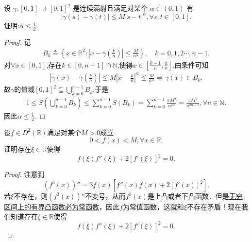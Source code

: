 \documentclass[../../main.tex]{subfiles}
\begin{document}
\begin{example}
设 $\gamma:[0,1]\to[0,1]^2$ 是连续满射且满足对某个 $\alpha\in(0,1)$ 有
\[
|\gamma(s)-\gamma(t)|\leqslant M|s-t|^\alpha,\forall s,t\in[0,1].
\]
证明:$\alpha\leqslant\frac{1}{2}$.
\end{example}
\begin{proof}
记
\begin{align*}
B_k\triangleq \left\{ x\in \mathbb{R} ^2:\left| x-\gamma \left( \frac{k}{n} \right) \right|\leqslant \frac{M}{n^{\alpha}} \right\},\quad k=0,1,2\cdots,n-1.
\end{align*}
对$\forall x\in \left[ 0,1 \right]$,存在$k\in \left[ 0,n-1 \right] \cap \mathbb{N}$,使得$x\in \left[ \frac{k-1}{n},\frac{k}{n} \right]$.由条件可知
\begin{align*}
\left| \gamma \left( x \right) -\gamma \left( \frac{k}{n} \right) \right|\leqslant M\left| x-\frac{k}{n} \right|^{\alpha}\leqslant \frac{M}{n^{\alpha}}\Longrightarrow \gamma \left( x \right) \in B_k.
\end{align*}
故$\gamma$的值域$\left[ 0,1 \right] ^2\subseteq \bigcup_{k=0}^{n-1}{B_k}$.于是
\begin{align*}
1\leqslant S\left( \bigcup_{k=0}^{n-1}{B_k} \right) \leqslant \sum_{k=0}^{n-1}{S\left( B_k \right)}=\sum_{k=0}^{n-1}{\frac{\pi M^2}{n^{2\alpha}}}=\frac{\pi M^2}{n^{2\alpha -1}},\forall n\in \mathbb{N}.
\end{align*}
因此$\alpha \leqslant \frac{1}{2}$.

\end{proof}

\begin{example}
设$f \in D^2(\mathbb{R})$满足对某个$M > 0$成立
$$0 < f(x) < M, \forall x \in \mathbb{R}.$$
证明存在$\xi \in \mathbb{R}$使得
$$f(\xi)f''(\xi) + 2[f'(\xi)]^2 = 0.$$
\end{example}
\begin{proof}
注意到
$$(f^3(x))'' = 3f(x)\left[f''(x)f(x) + 2[f'(x)]^2\right].$$
若$\xi$不存在，则$(f^3(x))''$不变号，从而$f^3(x)$是上凸或者下凸函数．但是\hyperref[proposition:无穷区间上的有界凸函数必为常函数]{无穷区间上的有界凸函数必为常函数}，因此$f$为常值函数，这就和$\xi$不存在矛盾！现在我们知道存在$\xi \in \mathbb{R}$使得
$$f(\xi)f''(\xi) + 2[f'(\xi)]^2 = 0.$$

\end{proof}
\end{document}
